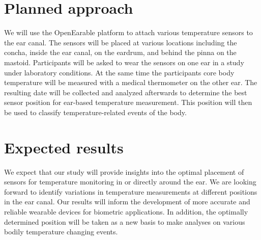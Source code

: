 \section{Planned approach}
We will use the OpenEarable platform to attach various temperature sensors to the ear canal. The sensors will be placed at various locations including the concha, inside the ear canal, on the eardrum, and behind the pinna on the mastoid. Participants will be asked to wear the sensors on one ear in a study under laboratory conditions.
At the same time the participants core body temperature will be measured with a medical thermometer on the other ear.
The resulting date will be collected and analyzed afterwards to determine the best sensor position for ear-based temperature measurement. This position will then be used to classify temperature-related events of the body.



\section{Expected results}
We expect that our study will provide insights into the optimal placement of sensors for temperature monitoring in or directly around the ear. We are looking forward to identify variations in temperature measurements at different positions in the ear canal. Our results will inform the development of more accurate and reliable wearable devices for biometric applications. In addition, the optimally determined position will be taken as a new basis to make analyses on various bodily temperature changing events.

